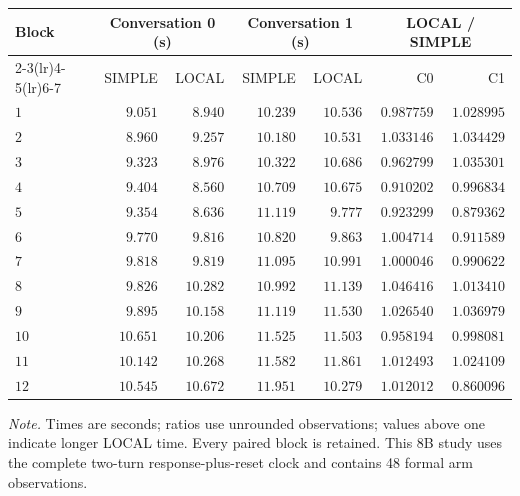 \begingroup
\fontsize{8.7}{10.5}\selectfont
\setlength{\tabcolsep}{3.5pt}\renewcommand{\arraystretch}{1.03}
\noindent
\begin{tabular*}{\linewidth}{@{\extracolsep{\fill}}lrrrrrr@{}}
\toprule
Block & \multicolumn{2}{c}{Conversation 0 (s)} & \multicolumn{2}{c}{Conversation 1 (s)} & \multicolumn{2}{c}{LOCAL / SIMPLE}\\
\cmidrule(lr){2-3}\cmidrule(lr){4-5}\cmidrule(lr){6-7}
 & SIMPLE & LOCAL & SIMPLE & LOCAL & C0 & C1\\
\midrule
$1$ & $9.051$ & $8.940$ & $10.239$ & $10.536$ & $0.987759$ & $1.028995$\\
$2$ & $8.960$ & $9.257$ & $10.180$ & $10.531$ & $1.033146$ & $1.034429$\\
$3$ & $9.323$ & $8.976$ & $10.322$ & $10.686$ & $0.962799$ & $1.035301$\\
$4$ & $9.404$ & $8.560$ & $10.709$ & $10.675$ & $0.910202$ & $0.996834$\\
\addlinespace[2.5pt]
$5$ & $9.354$ & $8.636$ & $11.119$ & $9.777$ & $0.923299$ & $0.879362$\\
$6$ & $9.770$ & $9.816$ & $10.820$ & $9.863$ & $1.004714$ & $0.911589$\\
$7$ & $9.818$ & $9.819$ & $11.095$ & $10.991$ & $1.000046$ & $0.990622$\\
$8$ & $9.826$ & $10.282$ & $10.992$ & $11.139$ & $1.046416$ & $1.013410$\\
\addlinespace[2.5pt]
$9$ & $9.895$ & $10.158$ & $11.119$ & $11.530$ & $1.026540$ & $1.036979$\\
$10$ & $10.651$ & $10.206$ & $11.525$ & $11.503$ & $0.958194$ & $0.998081$\\
$11$ & $10.142$ & $10.268$ & $11.582$ & $11.861$ & $1.012493$ & $1.024109$\\
$12$ & $10.545$ & $10.672$ & $11.951$ & $10.279$ & $1.012012$ & $0.860096$\\
\bottomrule
\end{tabular*}
\par\smallskip
\fontsize{8}{9.6}\selectfont\raggedright
\textit{Note.} Times are seconds; ratios use unrounded observations; values above one indicate longer LOCAL time. Every paired block is retained. This 8B study uses the complete two-turn response-plus-reset clock and contains 48 formal arm observations.
\par\endgroup
